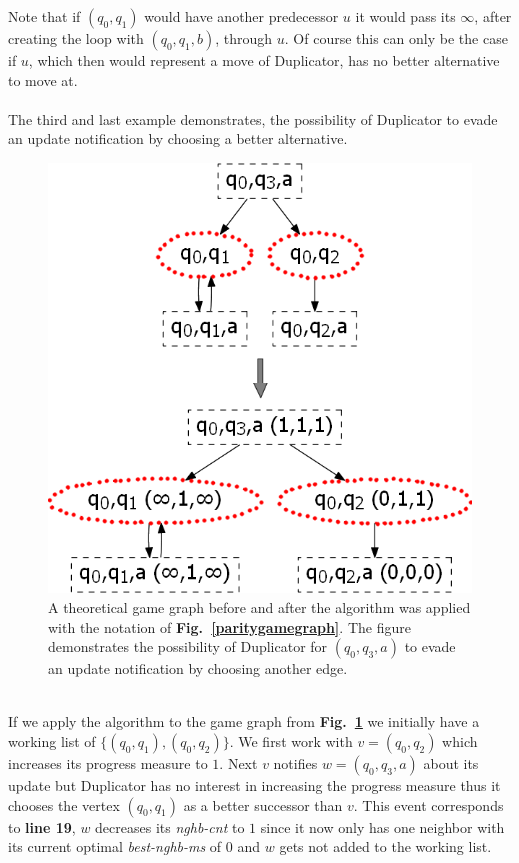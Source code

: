 \documentclass[12pt,oneside,bibliography=totoc,abstracton]{scrartcl}
\newcommand{\figref}[1]{\textbf{Fig.~\ref{#1}}}
\begin{document}
Note that if $(q_0, q_1)$ would have another predecessor $u$ it would pass its $\infty$, after creating the
loop with $(q_0, q_1, b)$, through $u$. Of course this can only be the case if $u$, which then would represent
a move of Duplicator, has no better alternative to move at.\\\\
The third and last example demonstrates, the possibility of Duplicator to evade an update notification
by choosing a better alternative.
\begin{figure}[ht]
	 \begin{center}
		\includegraphics[scale=0.6]{res/algorithm_thirdex}
	\end{center}
	\caption{A theoretical game graph before and after the algorithm was applied
		with the notation of \figref{paritygamegraph}. The figure demonstrates the
		possibility of Duplicator for $(q_0, q_3, a)$ to evade an update
		notification by choosing another edge.}
	\label{algorithmthirdex}
\end{figure}\quad\\
If we apply the algorithm to the game graph from \figref{algorithmthirdex} we initially have a
working list of $\{(q_0, q_1), (q_0, q_2)\}$. We first work with $v = (q_0, q_2)$ which increases its
progress measure to $1$. Next $v$ notifies $w = (q_0, q_3, a)$ about its update but Duplicator has
no interest in increasing the progress measure thus it chooses the vertex $(q_0, q_1)$ as
a better successor than $v$. This event corresponds to \textbf{line 19}, $w$ decreases its \textit{nghb-cnt}
to $1$ since it now only has one neighbor with its current optimal \textit{best-nghb-ms} of $0$ and $w$
gets not added to the working list.
\end{document}
